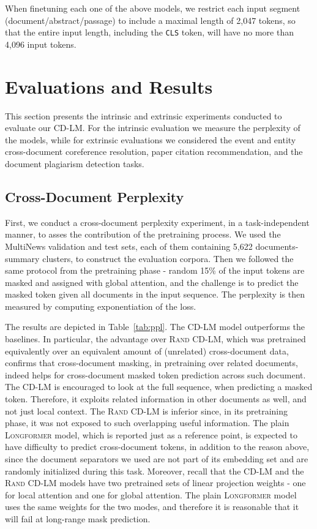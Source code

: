 \documentclass[11pt,a4paper]{article}
\begin{document}
When finetuning each one of the above models, we restrict each input segment (document/abstract/passage) to include a maximal length of 2,047 tokens, so that the entire input length, including the {\tt CLS} token, will have no more than 4,096 input tokens. \section{Evaluations and Results}
\label{sec:eval}
This section presents the intrinsic and extrinsic experiments conducted to evaluate our CD-LM. For the intrinsic evaluation we measure the perplexity of the models, while for extrinsic evaluations we considered the event and entity cross-document coreference resolution, paper citation recommendation, and the document plagiarism detection tasks.
\subsection{Cross-Document Perplexity}
\label{subsec:cdppl}
First, we conduct a cross-document perplexity experiment, in a task-independent manner, to asses the contribution of the pretraining process. We used the MultiNews validation and test sets, each of them containing 5,622 documents-summary clusters, to construct the evaluation corpora. Then we followed the same protocol from the pretraining phase - random 15\% of the input tokens are masked and assigned with global attention, and the challenge is to predict the masked token given all documents in the input sequence. The perplexity is then measured by computing exponentiation of the loss. 


The results are depicted in Table~\ref{tab:ppl}. The \textsc{CD-LM} model outperforms the baselines. In particular, the advantage over \textsc{Rand CD-LM}, which was pretrained equivalently over an equivalent amount of (unrelated) cross-document data, confirms that cross-document masking, in pretraining over related documents, indeed helps for cross-document masked token prediction across such document. The \textsc{CD-LM} is encouraged to look at the full sequence, when predicting a masked token. Therefore, it exploits related information in other documents as well, and not just local context. The \textsc{Rand CD-LM} is inferior since, in its pretraining phase, it was not exposed to such overlapping useful information. The plain \textsc{Longformer} model, which is reported just as a reference point, is expected to have difficulty to predict cross-document tokens, in addition to the reason above, since the document separators we used are not part of its embedding set and are randomly initialized during this task. Moreover, recall that the \textsc{CD-LM} and the \textsc{Rand CD-LM} models have two pretrained sets of linear projection weights - one for local attention and one for global attention. The plain \textsc{Longformer} model uses the same weights for the two modes, and therefore it is reasonable that it will fail at long-range mask prediction.
\end{document}
